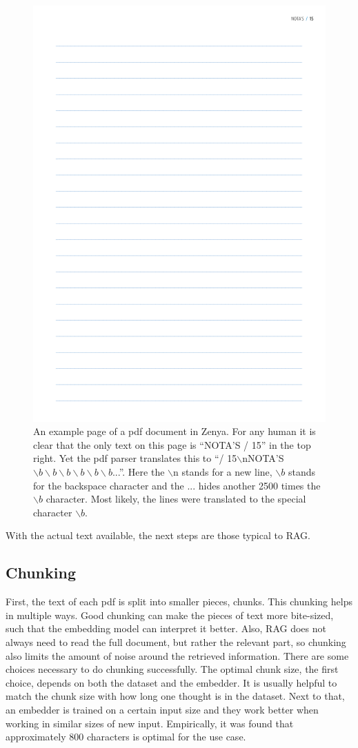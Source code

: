 \begin{figure}[H]
    \centerline{\includegraphics[width=0.7\linewidth]{fig/pdf_clutter.png}}
    \caption{An example page of a pdf document in Zenya. For any human it is clear that the only text on this page is ``NOTA'S / 15'' in the top right. Yet the pdf parser translates this to ``/  15$\backslash$nNOTA'S$\backslash b \backslash b \backslash b \backslash b \backslash b \backslash b$...''. Here the $\backslash$n stands for a new line, $\backslash b$ stands for the backspace character and the ... hides another 2500 times the $\backslash b$ character. Most likely, the lines were translated to the special character $\backslash b$.}
    \label{fig:pdf_clutter}
\end{figure}

With the actual text available, the next steps are those typical to RAG. 

\subsection{Chunking}
First, the text of each pdf is split into smaller pieces, chunks. This chunking helps in multiple ways. Good chunking can make the pieces of text more bite-sized, such that the embedding model can interpret it better. Also, RAG does not always need to read the full document, but rather the relevant part, so chunking also limits the amount of noise around the retrieved information. There are some choices necessary to do chunking successfully. The optimal chunk size, the first choice, depends on both the dataset and the embedder. It is usually helpful to match the chunk size with how long one thought is in the dataset. Next to that, an embedder is trained on a certain input size and they work better when working in similar sizes of new input. Empirically, it was found that approximately 800 characters is optimal for the use case. 


